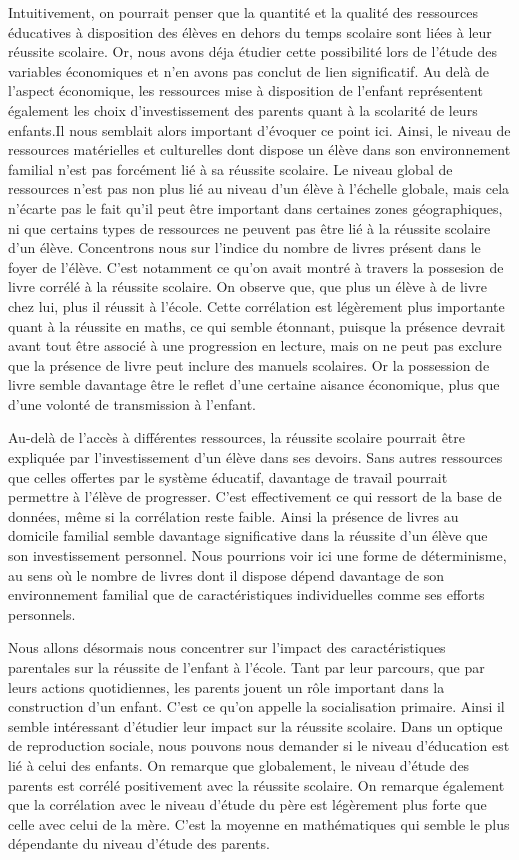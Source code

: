 \documentclass[
  french,
  11pt,
  a4paper,
]{report}
\begin{document}
Intuitivement, on pourrait penser que la quantité et la qualité des
ressources éducatives à disposition des élèves en dehors du temps
scolaire sont liées à leur réussite scolaire. Or, nous avons déja
étudier cette possibilité lors de l'étude des variables économiques et
n'en avons pas conclut de lien significatif. Au delà de l'aspect
économique, les ressources mise à disposition de l'enfant représentent
également les choix d'investissement des parents quant à la scolarité de
leurs enfants.Il nous semblait alors important d'évoquer ce point ici.
Ainsi, le niveau de ressources matérielles et culturelles dont dispose
un élève dans son environnement familial n'est pas forcément lié à sa
réussite scolaire. Le niveau global de ressources n'est pas non plus lié
au niveau d'un élève à l'échelle globale, mais cela n'écarte pas le fait
qu'il peut être important dans certaines zones géographiques, ni que
certains types de ressources ne peuvent pas être lié à la réussite
scolaire d'un élève. Concentrons nous sur l'indice du nombre de livres
présent dans le foyer de l'élève. C'est notamment ce qu'on avait montré
à travers la possesion de livre corrélé à la réussite scolaire. On
observe que, que plus un élève à de livre chez lui, plus il réussit à
l'école. Cette corrélation est légèrement plus importante quant à la
réussite en maths, ce qui semble étonnant, puisque la présence devrait
avant tout être associé à une progression en lecture, mais on ne peut
pas exclure que la présence de livre peut inclure des manuels scolaires.
Or la possession de livre semble davantage être le reflet d'une certaine
aisance économique, plus que d'une volonté de transmission à l'enfant.

Au-delà de l'accès à différentes ressources, la réussite scolaire
pourrait être expliquée par l'investissement d'un élève dans ses
devoirs. Sans autres ressources que celles offertes par le système
éducatif, davantage de travail pourrait permettre à l'élève de
progresser. C'est effectivement ce qui ressort de la base de données,
même si la corrélation reste faible. Ainsi la présence de livres au
domicile familial semble davantage significative dans la réussite d'un
élève que son investissement personnel. Nous pourrions voir ici une
forme de déterminisme, au sens où le nombre de livres dont il dispose
dépend davantage de son environnement familial que de caractéristiques
individuelles comme ses efforts personnels.

Nous allons désormais nous concentrer sur l'impact des caractéristiques
parentales sur la réussite de l'enfant à l'école. Tant par leur
parcours, que par leurs actions quotidiennes, les parents jouent un rôle
important dans la construction d'un enfant. C'est ce qu'on appelle la
socialisation primaire. Ainsi il semble intéressant d'étudier leur
impact sur la réussite scolaire. Dans un optique de reproduction
sociale, nous pouvons nous demander si le niveau d'éducation est lié à
celui des enfants. On remarque que globalement, le niveau d'étude des
parents est corrélé positivement avec la réussite scolaire. On remarque
également que la corrélation avec le niveau d'étude du père est
légèrement plus forte que celle avec celui de la mère. C'est la moyenne
en mathématiques qui semble le plus dépendante du niveau d'étude des
parents.
\end{document}
